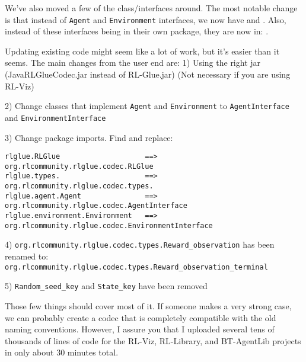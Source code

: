 \documentclass[11pt]{article}
\begin{document}
We've also moved a few of the class/interfaces around.  The most notable change is that instead of \texttt{Agent} and \texttt{Environment} interfaces, we now have 
 and 
.
Also, instead of these interfaces being in their own package, they are now in: . 



Updating existing code might seem like a lot of work, but it's easier than it seems.  The main changes from the user end are:
1) Using the right jar (JavaRLGlueCodec.jar instead of RL-Glue.jar)  (Not necessary if you are using RL-Viz)



2) Change classes that implement \texttt{Agent} and \texttt{Environment} to \texttt{AgentInterface} and \texttt{EnvironmentInterface}

3) Change package imports.  Find and replace:
\begin{verbatim}
rlglue.RLGlue                    ==>    org.rlcommunity.rlglue.codec.RLGlue
rlglue.types.                    ==>    org.rlcommunity.rlglue.codec.types.
rlglue.agent.Agent               ==>    org.rlcommunity.rlglue.codec.AgentInterface
rlglue.environment.Environment   ==>    org.rlcommunity.rlglue.codec.EnvironmentInterface
\end{verbatim}

4) \texttt{org.rlcommunity.rlglue.codec.types.Reward\_observation} has been renamed to:\\
\texttt{org.rlcommunity.rlglue.codec.types.Reward\_observation\_terminal}

5) \texttt{Random\_seed\_key} and \texttt{State\_key} have been removed

Those few things should cover most of it.  If someone makes a very strong case, we can probably create a codec that is completely compatible with the old naming conventions.  However, I assure you that I uploaded
several tens of thousands of lines of code for the RL-Viz, RL-Library, and BT-AgentLib projects in only about 30 minutes total.
\end{document}
